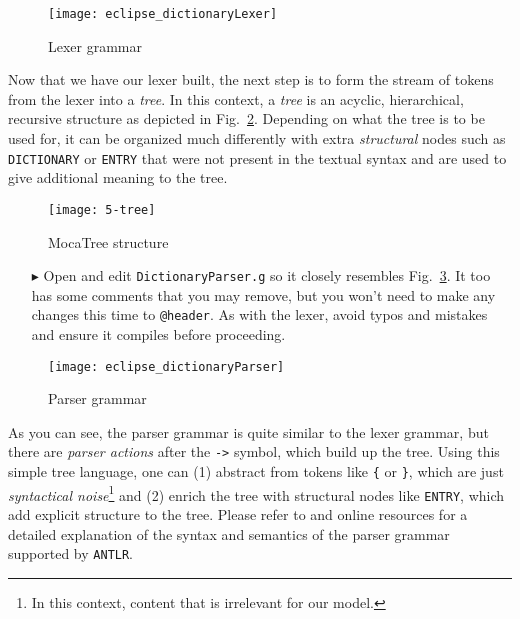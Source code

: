 \begin{figure}[!htbp]
\begin{center}
  \texttt{[image: eclipse\_dictionaryLexer]}
  \caption{Lexer grammar}
  \label{eclipse:dictionaryLexer}
\end{center}
\end{figure}

Now that we have our lexer built, the next step is to form the stream of tokens from the lexer into a \emph{tree}. In this context, a \emph{tree} is an acyclic,
hierarchical, recursive structure as depicted in Fig.~\ref{eclipse:dictLexer}. Depending on what the tree is to be used for, it can be organized much differently
with extra \emph{structural} nodes such as \texttt{DICTIONARY} or \texttt{ENTRY} that were not present in the textual syntax and are used to give additional
meaning to the tree.

\begin{figure}[htp]
\begin{center}
 \texttt{[image: 5-tree]}
  \caption{MocaTree structure}
  \label{eclipse:dictLexer}
\end{center}
\end{figure}

\begin{itemize}

\item[$\blacktriangleright$] Open and edit \texttt{DictionaryParser.g} so it closely resembles Fig.~\ref{eclipse:dictParser}. It too has some comments that you
may remove, but you won't need to make any changes this time to \texttt{@header}. As with the lexer, avoid typos and mistakes and ensure it compiles before
proceeding.

\end{itemize}

\begin{figure}[!htbp]
\begin{center}
 \texttt{[image: eclipse\_dictionaryParser]}
  \caption{Parser grammar}
  \label{eclipse:dictParser}
\end{center}
\end{figure}

As you can see, the parser grammar is quite similar to the lexer grammar, but there are \emph{parser actions} after the \texttt{->} symbol, which build up the
tree. Using this simple tree language, one can (1) abstract from tokens like \texttt{\{} or \texttt{\}}, which are just \emph{syntactical noise}\footnote{In
this context, content that is irrelevant for our model.} and (2) enrich the tree with structural nodes like \texttt{ENTRY}, which add explicit structure to the
tree. Please refer to \cite{ANTLR} and online resources for a detailed explanation of the syntax and semantics of the parser grammar supported by
\texttt{ANTLR}.

